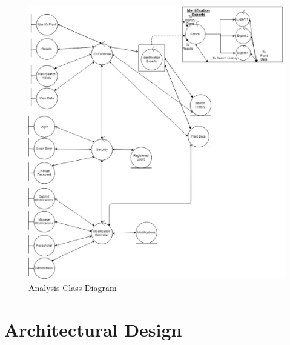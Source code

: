 \documentclass[]{article}
\begin{document}
    \begin{figure}[!hb]
      \includegraphics[width=\linewidth]{ACD.jpg}
      \caption{Analysis Class Diagram}
      \label{fig:ACD}
    \end{figure}
    
\clearpage

\section{Architectural Design}
\label{sec:architectural_design}
\end{document}

